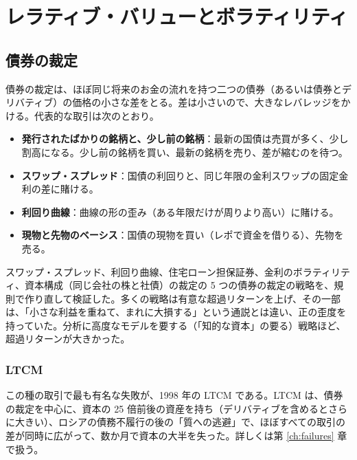 \chapter{レラティブ・バリューとボラティリティ}
\label{ch:rv}

\section{債券の裁定}

債券の裁定は、ほぼ同じ将来のお金の流れを持つ二つの債券（あるいは債券とデリバティブ）の価格の小さな差をとる。差は小さいので、大きなレバレッジをかける。代表的な取引は次のとおり。

\begin{itemize}
\item \textbf{発行されたばかりの銘柄と、少し前の銘柄}：最新の国債は売買が多く、少し割高になる。少し前の銘柄を買い、最新の銘柄を売り、差が縮むのを待つ。
\item \textbf{スワップ・スプレッド}：国債の利回りと、同じ年限の金利スワップの固定金利の差に賭ける。
\item \textbf{利回り曲線}：曲線の形の歪み（ある年限だけが周りより高い）に賭ける。
\item \textbf{現物と先物のベーシス}：国債の現物を買い（レポで資金を借りる）、先物を売る。
\end{itemize}

\begin{paperbox}
スワップ・スプレッド、利回り曲線、住宅ローン担保証券、金利のボラティリティ、資本構成（同じ会社の株と社債）の裁定の 5 つの債券の裁定の戦略を、規則で作り直して検証した。多くの戦略は有意な超過リターンを上げ、その一部は、「小さな利益を重ねて、まれに大損する」という通説とは違い、正の歪度を持っていた。分析に高度なモデルを要する（「知的な資本」の要る）戦略ほど、超過リターンが大きかった。
\end{paperbox}

\subsection{LTCM}

この種の取引で最も有名な失敗が、1998 年の LTCM である。LTCM は、債券の裁定を中心に、資本の 25 倍前後の資産を持ち（デリバティブを含めるとさらに大きい）、ロシアの債務不履行の後の「質への逃避」で、ほぼすべての取引の差が同時に広がって、数か月で資本の大半を失った。詳しくは第 \ref{ch:failures} 章で扱う。

